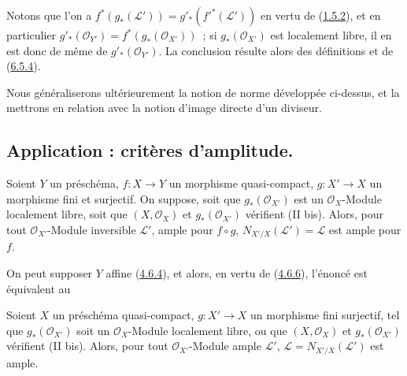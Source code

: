 Notons que l'on a $f^*(g_*(\mathcal{L}'))=g'_*({f'}^*(\mathcal{L}'))$ en
vertu de (\hyperref[II.1.5.2-fr]{1.5.2}), et en particulier
$g'_*(\mathcal{O}_{Y'})=f^*(g_*(\mathcal{O}_{X'}))$~; si
$g_*(\mathcal{O}_{X'})$ est localement libre, il en est donc de même de
$g'_*(\mathcal{O}_{Y'})$. La conclusion résulte alors des définitions et de
(\hyperref[II.6.5.4-fr]{6.5.4}).

\begin{remark}[6.5.9]
\label{II.6.5.9-fr}
Nous généraliserons ultérieurement la notion de norme développée ci-dessus,
et la mettrons en relation avec la notion d'image directe d'un diviseur.
\end{remark}

\subsection{Application : critères d'amplitude.}
\label{subsection:II.6.6-fr}

\begin{proposition}[6.6.1]
\label{II.6.6.1-fr}
Soient $Y$ un préschéma, $f:X\to Y$ un morphisme quasi-compact,
$g:X'\to X$ un morphisme fini et surjectif. On suppose, soit que
$g_*(\mathcal{O}_{X'})$ est un $\mathcal{O}_X$-Module localement libre, soit
que $(X,\mathcal{O}_X)$ et $g_*(\mathcal{O}_{X'})$ vérifient \textup{(II bis)}. Alors, pour tout $\mathcal{O}_{X'}$-Module inversible
$\mathcal{L}'$, ample pour $f\circ g$, $N_{X'/X}(\mathcal{L}')=\mathcal{L}$
est ample pour $f$.
\end{proposition}

On peut supposer $Y$ affine (\hyperref[II.4.6.4-fr]{4.6.4}), et alors, en
vertu de (\hyperref[II.4.6.6-fr]{4.6.6}), l'énoncé est équivalent au

\begin{corollary}[6.6.2]
\label{II.6.6.2-fr}
Soient $X$ un préschéma quasi-compact, $g:X'\to X$ un morphisme fini
surjectif, tel que $g_*(\mathcal{O}_{X'})$ soit un $\mathcal{O}_X$-Module
localement libre, ou que $(X,\mathcal{O}_X)$ et $g_*(\mathcal{O}_{X'})$
vérifient \textup{(II bis)}. Alors, pour tout $\mathcal{O}_{X'}$-Module ample
$\mathcal{L}'$, $\mathcal{L}=N_{X'/X}(\mathcal{L}')$ est ample.
\end{corollary}

